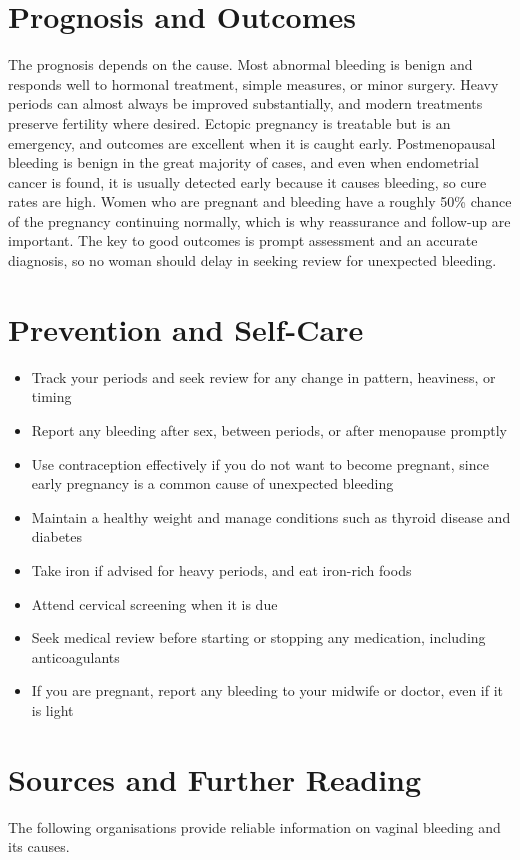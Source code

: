 \section*{Prognosis and Outcomes}
The prognosis depends on the cause. Most abnormal bleeding is benign and responds well to hormonal treatment, simple measures, or minor surgery. Heavy periods can almost always be improved substantially, and modern treatments preserve fertility where desired. Ectopic pregnancy is treatable but is an emergency, and outcomes are excellent when it is caught early. Postmenopausal bleeding is benign in the great majority of cases, and even when endometrial cancer is found, it is usually detected early because it causes bleeding, so cure rates are high. Women who are pregnant and bleeding have a roughly 50\% chance of the pregnancy continuing normally, which is why reassurance and follow-up are important. The key to good outcomes is prompt assessment and an accurate diagnosis, so no woman should delay in seeking review for unexpected bleeding.

\section*{Prevention and Self-Care}
\begin{itemize}
    \item Track your periods and seek review for any change in pattern, heaviness, or timing
    \item Report any bleeding after sex, between periods, or after menopause promptly
    \item Use contraception effectively if you do not want to become pregnant, since early pregnancy is a common cause of unexpected bleeding
    \item Maintain a healthy weight and manage conditions such as thyroid disease and diabetes
    \item Take iron if advised for heavy periods, and eat iron-rich foods
    \item Attend cervical screening when it is due
    \item Seek medical review before starting or stopping any medication, including anticoagulants
    \item If you are pregnant, report any bleeding to your midwife or doctor, even if it is light
\end{itemize}

\section*{Sources and Further Reading}
The following organisations provide reliable information on vaginal bleeding and its causes.

